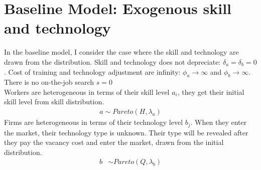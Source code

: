 \documentclass[12pt]{article}
\newcommand{\1}{\mathbb{1}}
\begin{document}
\section{Baseline Model: Exogenous skill and technology}
In the baseline model, I consider the case where the skill and technology are drawn from the distribution. Skill and technology does not depreciate: $\delta_a = \delta_b = 0$. Cost of training and technology adjustment are infinity: $\phi_a \to \infty$ and $\phi_b \to \infty$. There is no on-the-job search $s=0$  \\

Workers are heterogeneous in terms of their skill level $a_i$, they get their initial skill level from skill distribution. 
\begin{align*}
a \sim Pareto(H,\lambda_a)
\end{align*}
Firms are heterogeneous in terms of their technology level $b_j$. When they enter the market, their technology type is unknown. Their type will be revealed after they pay the vacancy cost and enter the market, drawn from the initial distribution. 
\begin{align*}
b &\sim Pareto(Q,\lambda_b)
\end{align*}
\end{document}
